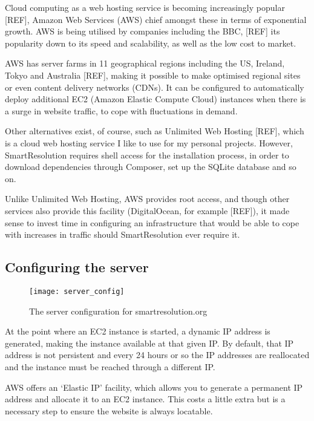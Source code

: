 Cloud computing as a web hosting service is becoming increasingly popular [REF], Amazon Web Services (AWS) chief amongst these in terms of exponential growth. AWS is being utilised by companies including the BBC, [REF] its popularity down to its speed and scalability, as well as the low cost to market.

AWS has server farms in 11 geographical regions including the US, Ireland, Tokyo and Australia [REF], making it possible to make optimised regional sites or even content delivery networks (CDNs). It can be configured to automatically deploy additional EC2 (Amazon Elastic Compute Cloud) instances when there is a surge in website traffic, to cope with fluctuations in demand.

Other alternatives exist, of course, such as Unlimited Web Hosting [REF], which is a cloud web hosting service I like to use for my personal projects. However, SmartResolution requires shell access for the installation process, in order to download dependencies through Composer, set up the SQLite database and so on.

Unlike Unlimited Web Hosting, AWS provides root access, and though other services also provide this facility (DigitalOcean, for example [REF]), it made sense to invest time in configuring an infrastructure that would be able to cope with increases in traffic should SmartResolution ever require it.

\subsection{Configuring the server}

\begin{figure}[h!]
  \centering
    \ifimages
    \texttt{[image: server\_config]}
    \fi
  \caption{The server configuration for smartresolution.org}
  \label{uml:serverConfig}
\end{figure}

At the point where an EC2 instance is started, a dynamic IP address is generated, making the instance available at that given IP. By default, that IP address is not persistent and every 24 hours or so the IP addresses are reallocated and the instance must be reached through a different IP.

AWS offers an `Elastic IP' facility, which allows you to generate a permanent IP address and allocate it to an EC2 instance. This costs a little extra but is a necessary step to ensure the website is always locatable.

